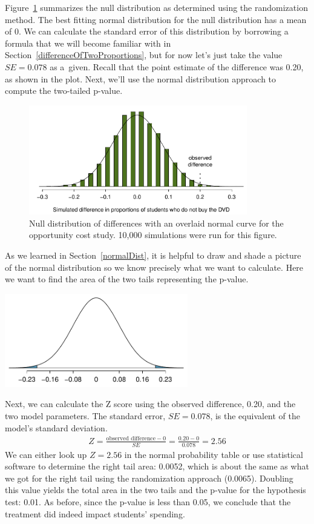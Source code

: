 Figure~\ref{OpportunityCostDiffs_w_normal} summarizes the null distribution as determined using the randomization method. The best fitting normal distribution for the null distribution has a mean of 0. We can calculate the standard error of this distribution by borrowing a formula that we will become familiar with in Section~\ref{differenceOfTwoProportions}, but for now let's just take the value $SE = 0.078$ as a~given. Recall that the point estimate of the difference was 0.20, as shown in the plot. Next, we'll use the normal distribution approach to compute the two-tailed p-value.

\begin{figure}
\centering
\includegraphics[width=0.85\textwidth]{02/figures/OpportunityCost/OpportunityCostDiffs_w_normal}
\caption{Null distribution of differences with an overlaid normal curve for the opportunity cost study. 10,000 simulations were run for this figure.}
\label{OpportunityCostDiffs_w_normal}
\end{figure}

As we learned in Section~\ref{normalDist}, it is helpful to draw and shade a picture of the normal distribution so we know precisely what we want to calculate. Here we want to find the area of the two tails representing the p-value.
\begin{center}
\includegraphics[width=0.6\textwidth]{02/figures/OpportunityCost/OpportunityCostDiffs_normal_only}
\end{center}
Next, we can calculate the Z score using the observed difference, 0.20, and the two model parameters. The standard error, $SE = 0.078$, is the equivalent of the model's standard deviation.
\begin{align*}
Z = \frac{\text{observed difference} - 0}{SE} = \frac{0.20 - 0}{0.078} = 2.56
\end{align*}
We can either look up $Z = 2.56$ in the normal probability table or use statistical software to determine the right tail area: 0.0052, which is about the same as what we got for the right tail using the randomization approach (0.0065). Doubling this value yields the total area in the two tails and the p-value for the hypothesis test: 0.01. As before, since the p-value is less than 0.05, we conclude that the treatment did indeed impact students' spending.

